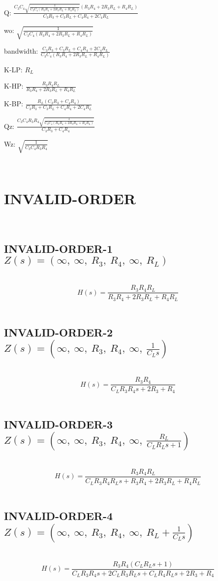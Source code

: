 \documentclass{article}
\begin{document}
Q: $\frac{C_{3} C_{4} \sqrt{\frac{1}{C_{3} C_{4} \left(R_{3} R_{4} + 2 R_{3} R_{L} + R_{4} R_{L}\right)}} \left(R_{3} R_{4} + 2 R_{3} R_{L} + R_{4} R_{L}\right)}{C_{3} R_{3} + C_{3} R_{L} + C_{4} R_{4} + 2 C_{4} R_{L}}$\ 

wo: $\sqrt{\frac{1}{C_{3} C_{4} \left(R_{3} R_{4} + 2 R_{3} R_{L} + R_{4} R_{L}\right)}}$\ 

bandwidth: $\frac{C_{3} R_{3} + C_{3} R_{L} + C_{4} R_{4} + 2 C_{4} R_{L}}{C_{3} C_{4} \left(R_{3} R_{4} + 2 R_{3} R_{L} + R_{4} R_{L}\right)}$\ 

K-LP: $R_{L}$\ 

K-HP: $\frac{R_{3} R_{4} R_{L}}{R_{3} R_{4} + 2 R_{3} R_{L} + R_{4} R_{L}}$\ 

K-BP: $\frac{R_{L} \left(C_{3} R_{3} + C_{4} R_{4}\right)}{C_{3} R_{3} + C_{3} R_{L} + C_{4} R_{4} + 2 C_{4} R_{L}}$\ 

Qz: $\frac{C_{3} C_{4} R_{3} R_{4} \sqrt{\frac{1}{C_{3} C_{4} \left(R_{3} R_{4} + 2 R_{3} R_{L} + R_{4} R_{L}\right)}}}{C_{3} R_{3} + C_{4} R_{4}}$\ 

Wz: $\sqrt{\frac{1}{C_{3} C_{4} R_{3} R_{4}}}$\ 

\ 

\section{INVALID-ORDER}\ 
\subsection{INVALID-ORDER-1 $Z(s) = \left( \infty, \  \infty, \  R_{3}, \  R_{4}, \  \infty, \  R_{L}\right)$ } \ 
\textbf{\[H(s) = \frac{R_{3} R_{4} R_{L}}{R_{3} R_{4} + 2 R_{3} R_{L} + R_{4} R_{L}}\] } \ 
\subsection{INVALID-ORDER-2 $Z(s) = \left( \infty, \  \infty, \  R_{3}, \  R_{4}, \  \infty, \  \frac{1}{C_{L} s}\right)$ } \ 
\textbf{\[H(s) = \frac{R_{3} R_{4}}{C_{L} R_{3} R_{4} s + 2 R_{3} + R_{4}}\] } \ 
\subsection{INVALID-ORDER-3 $Z(s) = \left( \infty, \  \infty, \  R_{3}, \  R_{4}, \  \infty, \  \frac{R_{L}}{C_{L} R_{L} s + 1}\right)$ } \ 
\textbf{\[H(s) = \frac{R_{3} R_{4} R_{L}}{C_{L} R_{3} R_{4} R_{L} s + R_{3} R_{4} + 2 R_{3} R_{L} + R_{4} R_{L}}\] } \ 
\subsection{INVALID-ORDER-4 $Z(s) = \left( \infty, \  \infty, \  R_{3}, \  R_{4}, \  \infty, \  R_{L} + \frac{1}{C_{L} s}\right)$ } \ 
\textbf{\[H(s) = \frac{R_{3} R_{4} \left(C_{L} R_{L} s + 1\right)}{C_{L} R_{3} R_{4} s + 2 C_{L} R_{3} R_{L} s + C_{L} R_{4} R_{L} s + 2 R_{3} + R_{4}}\] } \ 
\end{document}
